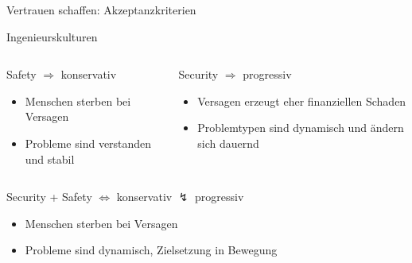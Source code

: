 \begin{frame}[T]{Vertrauen schaffen: Akzeptanzkriterien}

\end{frame}
\endgroup

\begin{frame}[T]{Ingenieurskulturen}
	\begin{columns}[t,fullwidth]
		\hfill
		\begin{column}{.45\linewidth}
			\begin{block}{Safety $\Longrightarrow$ konservativ}
				\begin{itemize}
				\item Menschen sterben bei Versagen
				\item Probleme sind verstanden und stabil
				\end{itemize}
			\end{block}
		\end{column}
		\begin{column}{.45\linewidth}
			\begin{block}{Security $\Longrightarrow$ progressiv}
				\begin{itemize}
				\item Versagen erzeugt eher finanziellen Schaden
				\item Problemtypen sind dynamisch und ändern sich dauernd
				\end{itemize}
			\end{block}
		\end{column}
		\hfill
	\end{columns}

	\begin{columns}[t,fullwidth]
			\hfill
	\begin{column}{\textwidth}
		\hfill\begin{block}{Security + Safety $\Longleftrightarrow$ konservativ $\lightning$ progressiv}
	    \begin{itemize}
	      \item Menschen sterben bei Versagen
	      \item Probleme sind dynamisch, Zielsetzung in Bewegung
	    \end{itemize}
  	\end{block}
  			\end{column}
  					\hfill
  	\end{columns}
\end{frame}

